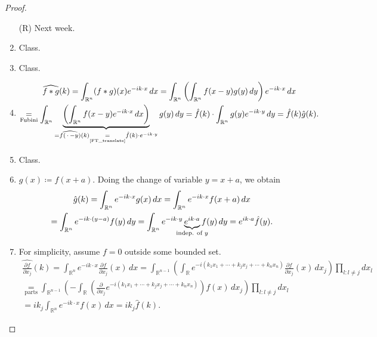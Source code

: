\documentclass[12pt]{article}
\theoremstyle{definition}
\begin{document}
\begin{proof}
\begin{enumerate}[label=\arabic*)]
\item[(R)] Next week.

\item Class.

\item Class.

\item
\begin{multline*}
\widehat{f*g}(k)=\int_{\mathbb R^n}(f*g)(x)e^{-ik\cdot x}\,dx=\int_{\mathbb R^n}\left(\int_{\mathbb R^n}f(x-y)g(y)\,dy\right)e^{-ik\cdot x}\,dx\\
\underset{\text{Fubini}}=\int_{\mathbb R^n}\underbrace{\left(\int_{\mathbb R^n}f(x-y)e^{-ik\cdot x}\,dx\right)}_{=\widehat{f(\,\cdot\,-y)}(k)\underset{\text{\ref{FT_translate}}}=\hat f(k)\cdot e^{-ik\cdot y}}g(y)\,dy=\hat f(k)\cdot\int_{\mathbb R^n}g(y)e^{-ik\cdot y}\,dy=\hat f(k)\hat g(k).
\end{multline*}

\item Class.

\item $g(x)\coloneqq f(x+a)$. Doing the change of variable $y=x+a$, we obtain
\begin{multline*}
\hat g(k)=\int_{\mathbb R^n}e^{-ik\cdot x}g(x)\,dx=\int_{\mathbb R^n}e^{-ik\cdot x}f(x+a)\,dx\\
=\int_{\mathbb R^n}e^{-ik\cdot(y-a)}f(y)\,dy=\int_{\mathbb R^n}e^{-ik\cdot y}\underbrace{e^{ik\cdot a}}_{\mathclap{\text{indep. of }y}}f(y)\,dy=e^{ik\cdot a}\hat f(y).
\end{multline*}

\item For simplicity, assume $f=0$ outside some bounded set.
\begin{multline*}
\widehat{\frac{\partial f}{\partial x_j}}(k)=\int_{\mathbb R^n}e^{-ik\cdot x}\frac{\partial f}{\partial x_j}(x)\,dx=\int_{\mathbb R^{n-1}}\left(\int_{\mathbb R}e^{-i(k_1x_1+\cdots+k_jx_j+\cdots+k_nx_n)}\frac{\partial f}{\partial x_j}(x)\,dx_j\right)\prod_{l:l\neq j}dx_l\\
\underset{\text{parts}}=\int_{\mathbb R^{n-1}}\left(-\int_{\mathbb R}\left(\frac\partial{\partial x_j}e^{-i(k_1x_1+\cdots+k_jx_j+\cdots+k_nx_n)}\right)f(x)\,dx_j\right)\prod_{l:l\neq j}dx_l\\
=ik_j\int_{\mathbb R^n}e^{-ik\cdot x}f(x)\,dx=ik_j\hat f(k).
\end{multline*}
\end{enumerate}
\end{proof}
\end{document}
